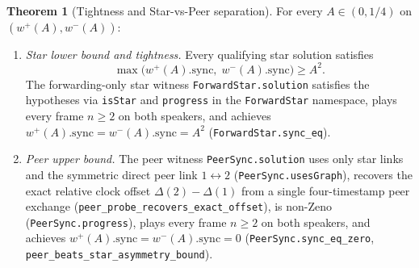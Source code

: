 \documentclass[11pt,a4paper]{article}
\newcommand{\lean}[1]{\texttt{#1}}
\theoremstyle{definition}
\newtheorem{theorem}[definition]{Theorem}
\begin{document}
\begin{theorem}[Tightness and Star-vs-Peer separation]
\label{thm:star-peer-sep}
For every $A \in (0, 1/4)$ on $(w^+(A), w^-(A))$:
\begin{enumerate}
\item \emph{Star lower bound and tightness.} Every qualifying star solution
  satisfies
  \[
    \max\bigl(w^+(A).\mathrm{sync},\; w^-(A).\mathrm{sync}\bigr) \ge A^2 .
  \]
  The forwarding-only star witness \lean{ForwardStar.solution} satisfies the
  hypotheses via \lean{isStar} and \lean{progress} in the
  \lean{ForwardStar} namespace, plays every frame
  $n \ge 2$ on both speakers, and achieves
  $w^+(A).\mathrm{sync} = w^-(A).\mathrm{sync} = A^2$
  (\lean{ForwardStar.\allowbreak sync\_\allowbreak eq}).
\item \emph{Peer upper bound.} The peer witness
  \lean{PeerSync.\allowbreak solution} uses only star links and the
  symmetric direct peer link $1 \leftrightarrow 2$
  (\lean{PeerSync.\allowbreak usesGraph}), recovers the exact relative clock
  offset $\Delta(2) - \Delta(1)$ from a single four-timestamp peer exchange
  (\lean{peer\_\allowbreak probe\_\allowbreak recovers\_\allowbreak exact\_\allowbreak offset}),
  is non-Zeno (\lean{PeerSync.\allowbreak progress}), plays every frame
  $n \ge 2$ on both speakers, and achieves
  $w^+(A).\mathrm{sync} = w^-(A).\mathrm{sync} = 0$
  (\lean{PeerSync.\allowbreak sync\_\allowbreak eq\_\allowbreak zero},
  \lean{peer\_\allowbreak beats\_\allowbreak star\_\allowbreak asymmetry\_\allowbreak bound}).
\end{enumerate}
\end{theorem}
\end{document}
